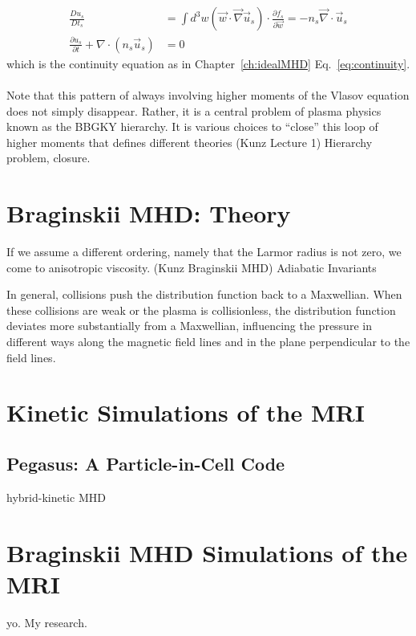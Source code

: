 \begin{align*}
  \frac{Du_s}{Dt_s}&=\int d^3w(\vec w\cdot\vec\nabla\vec u_s)\cdot\frac{\partial f_s}{\partial\vec w}=-n_s\vec\nabla\cdot\vec u_s\\
  \frac{\partial u_s}{\partial t}+\nabla\cdot(n_s\vec u_s)&=0
\end{align*}
which is the continuity equation as in Chapter~\ref{ch:idealMHD} Eq.~\ref{eq:continuity}.\\
\\
Note that this pattern of always involving higher moments of the Vlasov equation does not simply disappear. Rather, it is a central problem of plasma physics known as the BBGKY hierarchy. It is various choices to ``close'' this loop of higher moments that defines different theories
(Kunz Lecture 1)
Hierarchy problem, closure. 
\section{Braginskii MHD: Theory}\label{sec:bragMHDtheory}
If we assume a different ordering, namely that the Larmor radius is not zero, we come to anisotropic viscosity. 
(Kunz Braginskii MHD)
Adiabatic Invariants

In general, collisions push the distribution function back to a Maxwellian. When these collisions are weak or the plasma is collisionless, the distribution function deviates more substantially from a Maxwellian, influencing the pressure in different ways along the magnetic field lines and in the plane perpendicular to the field lines.

\section{Kinetic Simulations of the MRI}
\subsection{Pegasus: A Particle-in-Cell Code}
hybrid-kinetic MHD 

\section{Braginskii MHD Simulations of the MRI}
yo. My research. 



